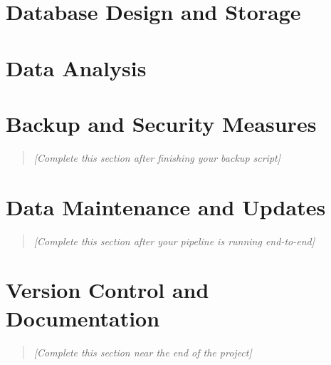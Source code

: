 \documentclass[12pt, letterpaper]{article}
\begin{document}
\section{Database Design and Storage}
\label{sec:database}


\section{Data Analysis}
\label{sec:analysis}


\section{Backup and Security Measures}
\label{sec:backup}
\begin{quote}
    \textit{[Complete this section after finishing your backup script]}
\end{quote}

\section{Data Maintenance and Updates}
\label{sec:maintenance}
\begin{quote}
    \textit{[Complete this section after your pipeline is running end-to-end]}
\end{quote}

\section{Version Control and Documentation}
\label{sec:versioning}
\begin{quote}
    \textit{[Complete this section near the end of the project]}
\end{quote}
\end{document}
